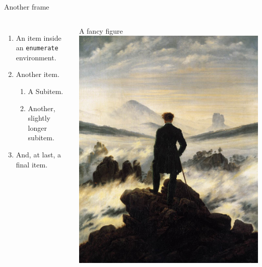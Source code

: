 \documentclass{beamer}
\begin{document}
\begin{frame}{Another frame}
\begin{columns}
	\begin{enumerate}
		\item An item inside an \texttt{enumerate} environment.
		\item Another item.
		\begin{enumerate}
			\item A Subitem.
			\item Another, slightly longer subitem.
		\end{enumerate}
		\item And, at last, a final item.
	\end{enumerate}
	\begin{fancyblock}[
	innertopmargin=0pt,
	innerbottommargin=0pt,
	innerleftmargin=0pt,
	innerrightmargin=0pt]{A fancy figure}
		\includegraphics[width=\textwidth]{wanderer}
	\end{fancyblock}
\end{columns}
\end{frame}
\end{document}
